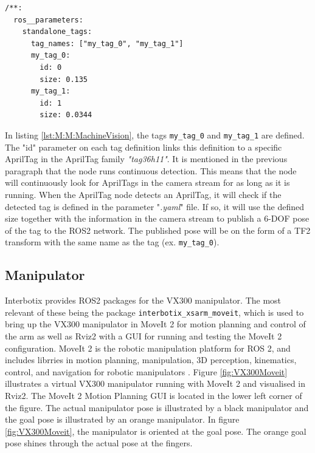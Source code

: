 \begin{lstlisting}[language=XML, label=lst:M:M:MachineVision, caption={Example of AprilTag tag definitions in a ".yaml" file. This example defines two tags of different names, using the tag id 0 and 1 in the defined tag family The size is alse defined for each tag. The tag family (tag36h11) is set in another parameter file.}]
/**:
  ros__parameters:
    standalone_tags:
      tag_names: ["my_tag_0", "my_tag_1"]
      my_tag_0:
        id: 0
        size: 0.135
      my_tag_1:
        id: 1
        size: 0.0344
\end{lstlisting}

In listing \ref{lst:M:M:MachineVision}, the tags \lstinline{my_tag_0} and \lstinline{my_tag_1} are defined. The "id" parameter on each tag definition links this definition to a specific AprilTag in the AprilTag family \textit{"tag36h11"}. It is mentioned in the previous paragraph that the node runs continuous detection. This means that the node will continuously look for AprilTags in the camera stream for as long as it is running. When the AprilTag node detects an AprilTag, it will check if the detected tag is defined in the parameter "\textit{.yaml}" file. If so, it will use the defined size together with the information in the camera stream to publish a 6-DOF pose of the tag to the ROS2 network. The published pose will be on the form of a TF2 transform with the same name as the tag (ex. \lstinline{my_tag_0}).

\subsection{Manipulator}\label{sec:M:MRC:Manipulator}
Interbotix provides ROS2 packages for the VX300 manipulator. The most relevant of these being the package \lstinline{interbotix_xsarm_moveit}, which is used to bring up the VX300 manipulator in MoveIt 2 for motion planning and control of the arm as well as Rviz2 with a GUI for running and testing the MoveIt 2 configuration. MoveIt 2 is the robotic manipulation platform for ROS 2, and includes librries in motion planning, manipulation, 3D perception, kinematics, control, and navigation for robotic manipulators \cite{moveit2_doc}. Figure \ref{fig:VX300Moveit} illustrates a virtual VX300 manipulator running with MoveIt 2 and visualised in Rviz2. The MoveIt 2 Motion Planning GUI is located in the lower left corner of the figure. The actual manipulator pose is illustrated by a black manipulator and the goal pose is illustrated by an orange manipulator. In figure \ref{fig:VX300Moveit}, the manipulator is oriented at the goal pose. The orange goal pose shines through the actual pose at the fingers.


